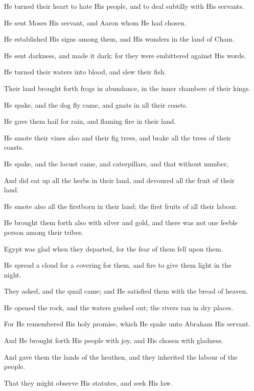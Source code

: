He turned their heart to hate His people, and to deal subtilly with His servants.

He sent Moses His servant, and Aaron whom He had chosen.

He established His signs among them, and His wonders in the land of Cham.

He sent darkness, and made it dark; for they were embittered against His words.

He turned their waters into blood, and slew their fish.

Their land brought forth frogs in abundance, in the inner chambers of their kings.

He spake, and the dog fly came, and gnats in all their coasts.

He gave them hail for rain, and flaming fire in their land.

He smote their vines also and their fig trees, and brake all the trees of their coasts.

He spake, and the locust came, and caterpillars, and that without number,

And did eat up all the herbs in their land, and devoured all the fruit of their land.

He smote also all the firstborn in their land; the first fruits of all their labour.

He brought them forth also with silver and gold, and there was not one feeble person among their tribes.

Egypt was glad when they departed, for the fear of them fell upon them.

He spread a cloud for a covering for them, and fire to give them light in the night.

They asked, and the quail came; and He satisfied them with the bread of heaven.

He opened the rock, and the waters gushed out; the rivers ran in dry places.

For He remembered His holy promise, which He spake unto Abraham His servant.

And He brought forth His people with joy, and His chosen with gladness.

And gave them the lands of the heathen, and they inherited the labour of the people.

That they might observe His statutes, and seek His law.
